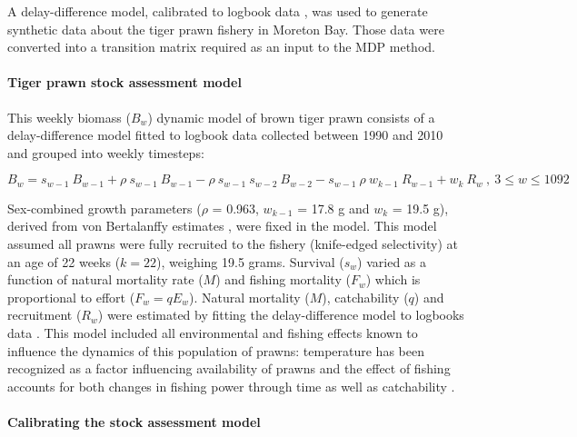 
A delay-difference model, calibrated to logbook data \citep{KienzleEtAl2015}, was used to generate synthetic data about the tiger prawn fishery in Moreton Bay. Those data were converted into a transition matrix required as an input to the MDP method.

\paragraph{Tiger prawn stock assessment model}

This weekly biomass ($B_{w}$) dynamic model of brown tiger prawn consists of a delay-difference model \citep{sch85a} fitted to logbook data collected between 1990 and 2010 and grouped into weekly timesteps: 

\begin{equation}
B_{w} = s_{w-1} \ B_{w-1} + \rho \ s_{w-1} \ B_{w-1} - \rho \ s_{w-1} \ s_{w-2} \ B_{w-2} - s_{w-1} \ \rho \ w_{k-1} \ R_{w-1} + w_{k} \ R_{w} \ ,\  3 \leq w \leq 1092
\end{equation}

Sex-combined growth parameters ($\rho$ = 0.963, $w_{k-1}$ = 17.8 g and $w_{k}$ = 19.5 g), derived from von Bertalanffy estimates \citep{grib94a}, were fixed in the model. This model assumed all prawns were fully recruited to the fishery (knife-edged selectivity) at an age of 22 weeks ($k=22$), weighing 19.5 grams. Survival ($s_{w}$) varied as a function of natural mortality rate ($M$) and fishing mortality ($F_{w}$) which is proportional to effort ($F_{w} = q E_{w}$). Natural mortality ($M$), catchability ($q$) and recruitment ($R_{w}$) were estimated by fitting the delay-difference model to logbooks data \citep{KienzleEtAl2015}. This model included all environmental and fishing effects known to influence the dynamics of this population of prawns: temperature has been recognized as a factor influencing availability of prawns and the effect of fishing accounts for both changes in fishing power through time as well as catchability \citep{KienzleEtAl2015}.

\paragraph{Calibrating the stock assessment model}

